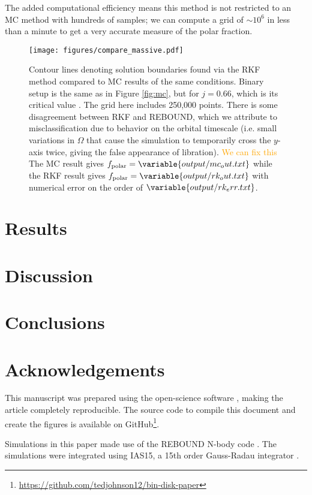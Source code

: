 \documentclass[twocolumn]{aastex631}
\newcommand\ghurl[0]{\url{https://github.com/tedjohnson12/bin-disk-paper}}
\newcommand{\TJ}[1]{\textcolor{orange}{#1}}
\begin{document}
The added computational efficiency means this method is not restricted to an MC method with hundreds of samples; we can compute a grid of $\sim 10^6$ in
less than a minute to get a very accurate measure of the polar fraction.

\begin{figure}
    \begin{centering}
        \texttt{[image: figures/compare\_massive.pdf]}
        \caption{
            Contour lines denoting solution boundaries found via the RKF method compared to MC results of the same conditions. Binary setup is the same
            as in Figure \ref{fig:mc}, but for $j=0.66$, which is its critical value \citep[see][]{martin2019,abod2022}. The grid here includes 250,000 points.
            There is some disagreement between RKF and {\sc REBOUND}, which we attribute to misclassification due to behavior on the orbital timescale (i.e. 
            small variations in $\Omega$ that cause the simulation to temporarily cross the $y$-axis twice, giving the false appearance of libration). \TJ{We can fix this}
            The MC result gives $f_{\text{polar}} = \variable{output/mc_out.txt}$ while the RKF result gives $f_{\text{polar}} = \variable{output/rk_out.txt}$ with
            numerical error on the order of $\variable{output/rk_err.txt}$.
        }
        \label{fig:rkf}
    \end{centering}
\end{figure}


\section{Results}
\label{sec:results}

\section{Discussion}
\label{sec:discussion}

\section{Conclusions}
\label{sec:conclusions}





\section{Acknowledgements}
\label{sec:ack}

This manuscript was prepared using the open-science software \href{https://show-your.work/en/latest/intro/}{\showyourwork} \citep{luger2021}, making the article completely
reproducible. The source code to compile this document and create the figures is available on GitHub\footnote{\ghurl}.

Simulations in this paper made use of the REBOUND N-body code \citep{rebound}.
The simulations were integrated using IAS15, a 15th order Gauss-Radau integrator \citep{reboundias15}. 



\end{document}
